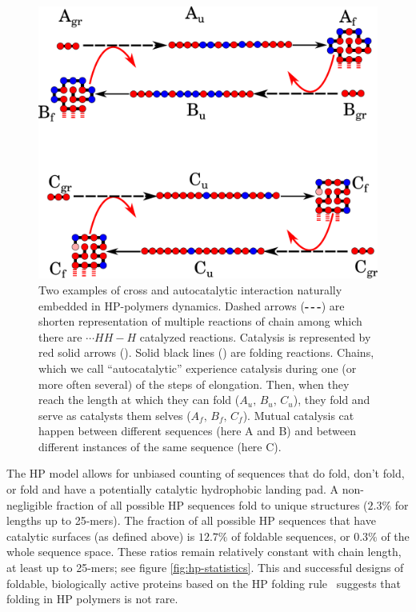 \documentclass[journal=jacsat,manuscript=article,layout=twocolumn]{achemso}
\newcommand*{\red}[1]{\textcolor{red}{#1}}
\begin{document}
\begin{figure}[h!]
  \centering
  \includegraphics[width=0.9\columnwidth]{pictures/catalysis-kinEx-all.pdf}
  \caption{\footnotesize{Two examples of cross and autocatalytic interaction naturally embedded in 
HP-polymers dynamics. Dashed arrows (\textbf{-\,-\,-}) are shorten representation of multiple 
reactions of chain among which there are $\cdots HH - H$ catalyzed reactions. Catalysis is 
represented by red solid arrows (\red{\textbf{\textemdash}}). Solid black lines 
(\textbf{\textemdash}) are folding reactions. Chains, which we call ``autocatalytic'' experience 
catalysis during one (or more often several) of the steps of elongation. Then, when they reach the 
length at which they can fold ($A_u,\, B_u,\, C_u$), they fold and serve as catalysts them selves 
($A_f,\, B_f,\, C_f$). Mutual catalysis cat happen between different sequences (here A and B) and 
between different instances of the same sequence (here C).}}
  \label{fig:kinExamples}
\end{figure}

 The HP model allows for unbiased counting of sequences that do fold, don't fold, or fold and have a potentially catalytic hydrophobic landing pad.  A non-negligible fraction of all possible HP 
sequences fold to unique structures ($2.3\% $ for lengths up to 25-mers). The fraction of all 
possible HP sequences that have catalytic surfaces (as defined above) is $12.7\%$ of foldable 
sequences, or $0.3\%$ of the whole sequence space.  These ratios remain relatively constant with 
chain length, at least up to 25-mers; see figure \ref{fig:hp-statistics}.  This and successful 
designs of foldable, biologically active proteins based on the HP folding rule~\cite{Murphy2015} 
suggests that folding in HP polymers is not rare.  
 
\end{document}
